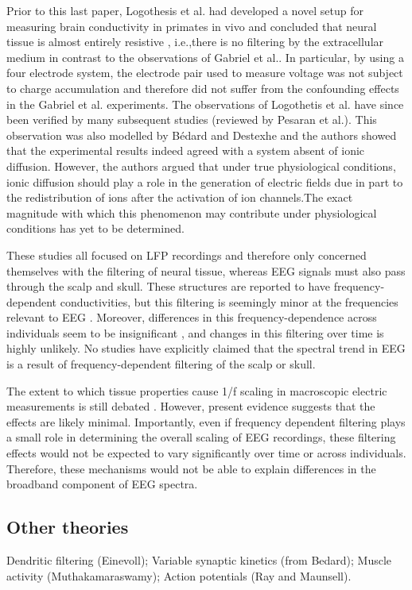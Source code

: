 Prior to this last paper, Logothesis et al.\cite{Logothetis2007} had developed a novel setup for measuring brain conductivity in primates in vivo and concluded that neural tissue is almost entirely resistive , i.e.,there is no filtering by the extracellular medium in contrast to the observations of Gabriel et al.\cite{Gabriel1996}. In particular, by using a four electrode system, the electrode pair used to measure voltage was not subject to charge accumulation and therefore did not suffer from the confounding effects in the Gabriel et al. experiments. The observations of Logothetis et al. have since been verified by many subsequent studies (reviewed by Pesaran et al.\cite{Pesaran2018}). This observation was also modelled by Bédard and Destexhe\cite{Bedard2006a} and the authors showed that the experimental results indeed agreed with a system absent of ionic diffusion. However, the authors argued that under true physiological conditions, ionic diffusion should play a role in the generation of electric fields due in part to the redistribution of ions after the activation of ion channels.The exact magnitude with which this phenomenon may contribute under physiological conditions has yet to be determined.

These studies all focused on LFP recordings and therefore only concerned themselves with the filtering of neural tissue, whereas EEG signals must also pass through the scalp and skull. These structures are reported to have frequency-dependent conductivities, but this filtering is seemingly minor at the frequencies relevant to EEG \cite{Pfurtscheller1975, Akhtari2002, Pesaran2018}. Moreover, differences in this frequency-dependence across individuals seem to be insignificant \cite{Akhtari2002}, and changes in this filtering over time is highly unlikely. No studies have explicitly claimed that the spectral trend in EEG is a result of frequency-dependent filtering of the scalp or skull.

The extent to which tissue properties cause 1/f scaling in macroscopic electric measurements is still debated \cite{Bedard2017}. However, present evidence suggests that the effects are likely minimal. Importantly, even if frequency dependent filtering plays a small role in determining the overall scaling of EEG recordings, these filtering effects would not be expected to vary significantly over time or across individuals. Therefore, these mechanisms would not be able to explain differences in the broadband component of EEG spectra. 


\subsection{Other theories} \label{sec:other_theories}
Dendritic filtering (Einevoll); Variable synaptic kinetics (from Bedard); Muscle activity (Muthakamaraswamy); Action potentials (Ray and Maunsell).

